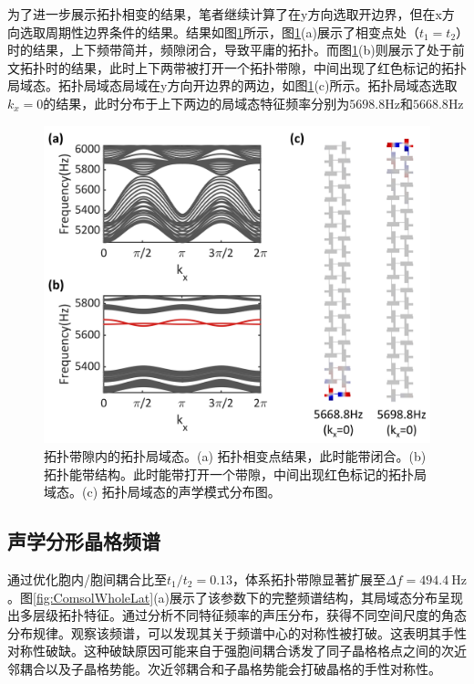 为了进一步展示拓扑相变的结果，笔者继续计算了在y方向选取开边界，但在x方向选取周期性边界条件的结果。结果如图\ref{fig:OBCPBC}所示，图\ref{fig:OBCPBC}(a)展示了相变点处（$t_1=t_2$）时的结果，上下频带简并，频隙闭合，导致平庸的拓扑。而图\ref{fig:OBCPBC}(b)则展示了处于前文拓扑时的结果，此时上下两带被打开一个拓扑带隙，中间出现了红色标记的拓扑局域态。拓扑局域态局域在y方向开边界的两边，如图\ref{fig:OBCPBC}(c)所示。拓扑局域态选取$k_x=0$的结果，此时分布于上下两边的局域态特征频率分别为$5698.8$Hz和$5668.8$Hz

\begin{figure}[htbp]
    \centering
    \includegraphics[width=0.65\linewidth]{figure/HOTIExp/OBCPBC.jpg}
    \caption{拓扑带隙内的拓扑局域态。(a) 拓扑相变点结果，此时能带闭合。(b) 拓扑能带结构。此时能带打开一个带隙，中间出现红色标记的拓扑局域态。(c) 拓扑局域态的声学模式分布图。} 
    \label{fig:OBCPBC}
\end{figure}
\subsection{声学分形晶格频谱}
\label{sec:fractal_states}
通过优化胞内/胞间耦合比至$t_1/t_2=0.13$，体系拓扑带隙显著扩展至$\Delta f=494.4\ \mathrm{Hz}$。图\ref{fig:ComsolWholeLat}(a)展示了该参数下的完整频谱结构，其局域态分布呈现出多层级拓扑特征。通过分析不同特征频率的声压分布，获得不同空间尺度的角态分布规律。观察该频谱，可以发现其关于频谱中心的对称性被打破。这表明其手性对称性破缺。这种破缺原因可能来自于强胞间耦合诱发了同子晶格格点之间的次近邻耦合以及子晶格势能。次近邻耦合和子晶格势能会打破晶格的手性对称性。

